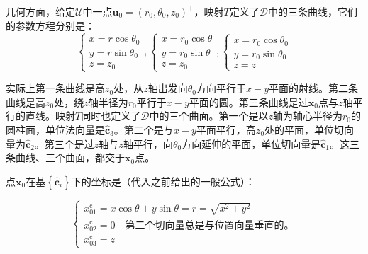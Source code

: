 \documentclass[../main.tex]{subfiles}
\begin{document}
\begin{example}[柱坐标]
    几何方面，给定$\mathcal{U}$中一点$\mathbf{u}_0=\left(r_0,\theta_0,z_0\right)^\intercal$，映射$T$定义了$\mathcal{D}$中的三条曲线，它们的参数方程分别是：
    \[
        \left\{\begin{array}{l}
            x=r\cos\theta_0 \\
            y=r\sin\theta_0 \\
            z=z_0\end{array}\right.,
        \left\{\begin{array}{l}
            x=r_0\cos\theta \\
            y=r_0\sin\theta \\
            z=z_0\end{array}\right.,
        \left\{\begin{array}{l}
            x=r_0\cos\theta_0 \\
            y=r_0\sin\theta_0 \\
            z=z\end{array}\right.\]

    实际上第一条曲线是高$z_0$处，从$z$轴出发向$\theta_0$方向平行于$x-y$平面的射线。第二条曲线是高$z_0$处，绕$z$轴半径为$r_0$平行于$x-y$平面的圆。第三条曲线是过$\mathbf{x}_0$点与$z$轴平行的直线。映射$T$同时也定义了$\mathcal{D}$中的三个曲面。第一个是以$z$轴为轴心半径为$r_0$的圆柱面，单位法向量是$\mathbf{\hat{c}}_3$。第二个是与$x-y$平面平行，高$z_0$处的平面，单位切向量为$\mathbf{\hat{c}}_2$。第三个是过$z$轴与$z$轴平行，向$\theta_0$方向延伸的平面，单位切向量是$\mathbf{\hat{c}}_1$。这三条曲线、三个曲面，都交于$\mathbf{x}_0$点。

    点$\mathbf{x}_0$在基$\left\{\mathbf{\hat{c}}_i\right\}$下的坐标是（代入之前给出的一般公式）：

    \[
        \left\{\begin{array}{l}
            x_{01}^\mathrm{c}=x\cos\theta+y\sin\theta=r=\sqrt{x^2+y^2} \\
            x_{02}^\mathrm{c}=0\quad\text{第二个切向量总是与位置向量垂直的。}           \\
            x_{03}^\mathrm{c}=z\end{array}\right.
    \]


\end{example}
\end{document}
